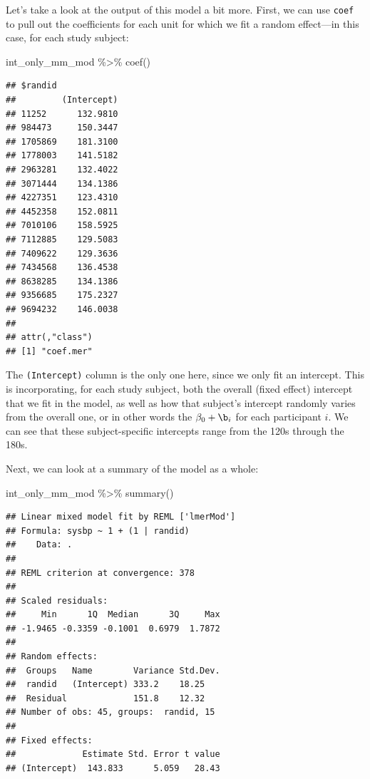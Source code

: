 \documentclass[
]{book}
\newenvironment{Shaded}{\begin{snugshade}}{\end{snugshade}}
\newcommand{\FunctionTok}[1]{\textcolor[rgb]{0.00,0.00,0.00}{#1}}
\newcommand{\NormalTok}[1]{#1}
\newcommand{\SpecialCharTok}[1]{\textcolor[rgb]{0.00,0.00,0.00}{#1}}
\begin{document}
Let's take a look at the output of this model a bit more. First, we can use
\texttt{coef} to pull out the coefficients for each unit for which we fit a random
effect---in this case, for each study subject:

\begin{Shaded}
\begin{Highlighting}[]
\NormalTok{int\_only\_mm\_mod }\SpecialCharTok{\%\textgreater{}\%}
  \FunctionTok{coef}\NormalTok{() }
\end{Highlighting}
\end{Shaded}

\begin{verbatim}
## $randid
##         (Intercept)
## 11252      132.9810
## 984473     150.3447
## 1705869    181.3100
## 1778003    141.5182
## 2963281    132.4022
## 3071444    134.1386
## 4227351    123.4310
## 4452358    152.0811
## 7010106    158.5925
## 7112885    129.5083
## 7409622    129.3636
## 7434568    136.4538
## 8638285    134.1386
## 9356685    175.2327
## 9694232    146.0038
## 
## attr(,"class")
## [1] "coef.mer"
\end{verbatim}

The \texttt{(Intercept)} column is the only one here, since we only fit an intercept.
This is incorporating, for each study subject, both the overall (fixed effect)
intercept that we fit in the model, as well as how that subject's intercept
randomly varies from the overall one, or in other words the \(\beta_{0} + \b_{i}\)
for each participant \(i\). We can see that these subject-specific intercepts
range from the 120s through the 180s.

Next, we can look at a summary of the model as a whole:

\begin{Shaded}
\begin{Highlighting}[]
\NormalTok{int\_only\_mm\_mod }\SpecialCharTok{\%\textgreater{}\%}
  \FunctionTok{summary}\NormalTok{()}
\end{Highlighting}
\end{Shaded}

\begin{verbatim}
## Linear mixed model fit by REML ['lmerMod']
## Formula: sysbp ~ 1 + (1 | randid)
##    Data: .
## 
## REML criterion at convergence: 378
## 
## Scaled residuals: 
##     Min      1Q  Median      3Q     Max 
## -1.9465 -0.3359 -0.1001  0.6979  1.7872 
## 
## Random effects:
##  Groups   Name        Variance Std.Dev.
##  randid   (Intercept) 333.2    18.25   
##  Residual             151.8    12.32   
## Number of obs: 45, groups:  randid, 15
## 
## Fixed effects:
##             Estimate Std. Error t value
## (Intercept)  143.833      5.059   28.43
\end{verbatim}
\end{document}
